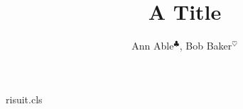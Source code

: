 \begin{filecontents*}[overwrite]{risuit.cls}
\renewcommand{\author}[1]{{\raggedright #1\par}}
\newcommand{\affil}[1]{{\small\raggedright #1}}
\end{filecontents*}
\documentclass{risuit}

\title{A Title}
\author{Ann Able$^{\clubsuit}$, Bob Baker$^{\heartsuit}$}





\maketitle
Text.

